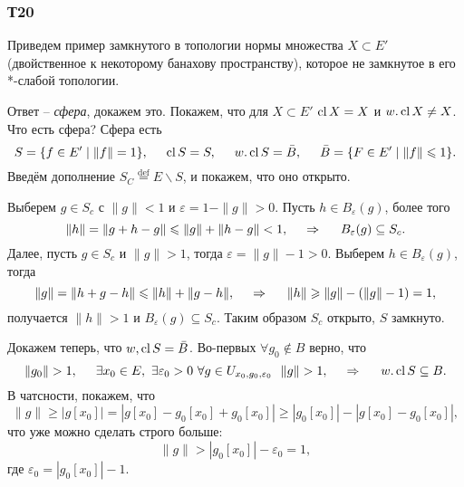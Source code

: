 
\subsubsection*{Т20}


Приведем пример замкнутого в топологии нормы множества $X \subset E'$ (двойственное к некоторому банахову пространству), которое не замкнутое в его *-слабой топологии. 


Ответ -- \textit{сфера}, докажем это. Покажем, что для $X \subset E'$ $\cl X = X$ и $w. \cl X \neq X$. Что есть сфера? Сфера есть
\begin{equation*}
    S = \{f \in E' \mid \|f\| = 1\}, 
    \hspace{5 mm} \cl S = S, 
    \hspace{5 mm} w. \cl S = \bar{B},
    \hspace{5 mm} 
    \bar{B} = \{F \in E' \mid \|f\|\leq 1\}.
\end{equation*}
Введём дополнение $S_C \overset{\mathrm{def}}{=} E\backslash S$, и покажем, что оно открыто. 


Выберем $g \in S_c$ с $\|g\|<1$ и $\varepsilon = 1- \|g\|> 0$. Пусть $h \in B_\varepsilon(g)$, более того
\begin{equation*}
    \|h\| = \|g + h - g\| \leq \|g\| + \|h-g\| < 1,
    \hspace{0.5cm} \Rightarrow \hspace{0.5cm}
    B_\varepsilon (g) \subseteq S_c. 
\end{equation*}
Далее, пусть $g \in S_c$ и $\|g\|>1$, тогда $\varepsilon = \|g\|-1 > 0$. Выберем $h \in B_\varepsilon (g)$, тогда 
\begin{equation*}
    \|g\| =  \|h+g-h\| \leq \|h\| + \|g-h\|,
    \hspace{0.5cm} \Rightarrow \hspace{0.5cm}
    \|h\| \geq \|g\|-(\|g\|-1) = 1,
\end{equation*}
получается $\|h\| > 1$ и $B_\varepsilon (g) \subseteq S_c$. Таким образом $S_c$ открыто, $S$ замкнуто. 


Докажем теперь, что $w, \cl S = \bar{B}$. Во-первых $\forall g_0 \notin B$ верно, что
\begin{equation*}
    \|g_0\| > 1,
    \hspace{5 mm} 
    \exists x_0 \in E, \ 
    \exists \varepsilon_0 > 0 \ 
    \forall g \in U_{x_0, g_0, \varepsilon_0} \ \ \|g\|>1,
    \hspace{0.5cm} \Rightarrow \hspace{0.5cm}
    w.\cl S \subseteq B. 
\end{equation*}
В чатсности, покажем, что
\begin{equation*}
    \|g\| \geq |g[x_0]| = |g[x_0] - g_0[x_0] + g_0[x_0]| \geq 
    |g_0[x_0]| - |g[x_0] - g_0[x_0]|,
\end{equation*}
что уже можно сделать строго больше:
\begin{equation*}
    \|g\| > |g_0 [x_0]| - \varepsilon_0 = 1,
\end{equation*}
где $\varepsilon_0 = |g_0[x_0]|-1$. 


